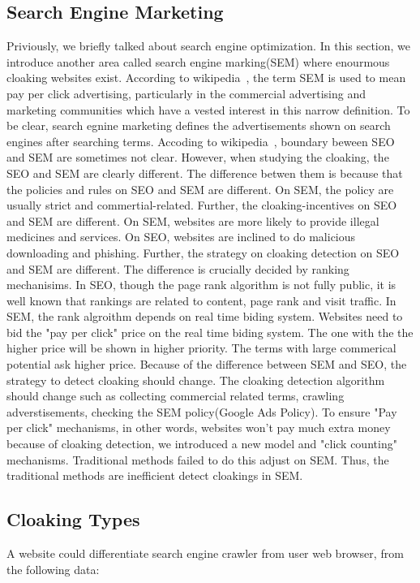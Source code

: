 \subsection{Search Engine Marketing}
Priviously, we briefly talked about search engine optimization. In this section, we introduce another area called search engine marking(SEM)
where enourmous cloaking websites exist. According to wikipedia~\cite{sem-wiki}, the term SEM is used to mean pay per click advertising,
particularly in the commercial advertising and marketing communities which have a vested interest in this narrow definition. To be clear,
search egnine marketing defines the advertisements shown on search engines after searching terms. Accoding to wikipedia~\cite{sem-wiki},
boundary beween SEO and SEM are sometimes not clear. However, when studying the cloaking, the SEO and SEM are clearly different. The difference
betwen them is because that the policies and rules on SEO and SEM are different. On SEM, the policy are usually strict and commertial-related. 
Further, the cloaking-incentives on SEO and SEM are different. On SEM, websites are more likely to provide illegal medicines and services. On SEO,
websites are inclined to do malicious downloading and phishing. 
Further, the strategy on cloaking detection on SEO and SEM are different. The difference is crucially decided by ranking mechanisims.
In SEO, though the page rank algorithm is not fully public, it is well known that rankings are related to content, page rank and visit traffic.
In SEM, the rank algroithm depends on real time biding system. Websites need to bid the "pay per click" price on the real time biding system. 
The one with the the higher price will be shown in higher priority. The terms with large commerical potential ask higher price. Because of the 
difference between SEM and SEO, the strategy to detect cloaking should change. The cloaking detection algorithm should change such as collecting commercial related terms, 
crawling adverstisements, checking the SEM policy(Google Ads Policy). To ensure "Pay per click" mechanisms, in other words,
websites won't pay much extra money because of cloaking detection, we introduced a new model and "click counting" mechanisms.
Traditional methods failed to do this adjust on SEM. Thus, the traditional methods are inefficient detect cloakings in SEM.
\subsection{Cloaking Types}
A website could differentiate search engine crawler from user web browser, from
the following data:
